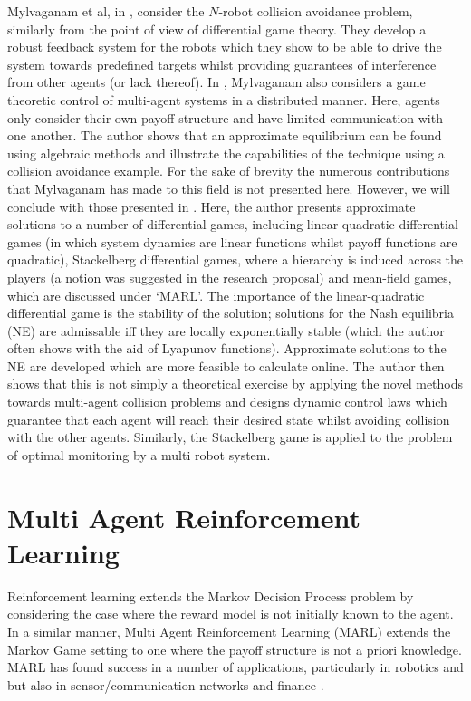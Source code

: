 \documentclass[.../main.tex]{subfiles}
\begin{document}
Mylvaganam et al, in \cite{Mylvaganam2017AutonomousApproach}, consider
the $N$-robot collision avoidance problem, similarly from the point of
view of differential game theory. They develop a robust feedback
system for the robots which they show to be able to drive the system
towards predefined targets whilst providing guarantees of interference
from other agents (or lack thereof).  In \cite{MylvaganamASystems},
Mylvaganam also considers a game theoretic control of multi-agent
systems in a distributed manner. Here, agents only consider their own
payoff structure and have limited communication with one another. The
author shows that an approximate equilibrium can be found using
algebraic methods and illustrate the capabilities of the technique
using a collision avoidance example. For the sake of brevity the
numerous contributions that Mylvaganam has made to this field is not
presented here. However, we will conclude with those presented in
\cite{Mylvaganam2014}. Here, the author presents approximate solutions
to a number of differential games, including linear-quadratic
differential games (in which system dynamics are linear functions
whilst payoff functions are quadratic), Stackelberg differential
games, where a hierarchy is induced across the players (a notion was
suggested in the research proposal) and mean-field games, which are
discussed under `MARL'. The importance of the linear-quadratic
differential game is the stability of the solution; solutions for the
Nash equilibria (NE) are admissable iff they are locally exponentially
stable (which the author often shows with the aid of Lyapunov
functions). Approximate solutions to the NE are developed which are
more feasible to calculate online. The author then shows that this is
not simply a theoretical exercise by applying the novel methods
towards multi-agent collision problems and designs dynamic control
laws which guarantee that each agent will reach their desired state
whilst avoiding collision with the other agents. Similarly, the
Stackelberg game is applied to the problem of optimal monitoring by a
multi robot system.

\section{Multi Agent Reinforcement Learning} \label{sec::MARL}

Reinforcement learning extends the Markov Decision Process problem by
considering the case where the reward model is not initially known to
the agent. In a similar manner, Multi Agent Reinforcement Learning
(MARL) extends the Markov Game setting to one where the payoff
structure is not a priori knowledge. MARL has found success in a number of applications,
particularly in robotics \cite{Yang2004} and but also in sensor/communication networks and finance
\cite{Zhang2019}.
\end{document}
